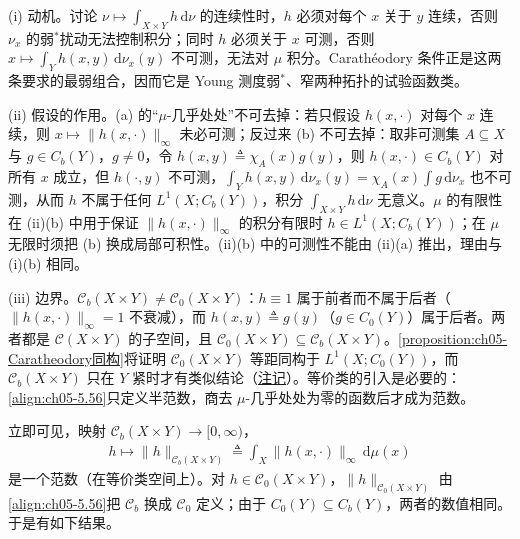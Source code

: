 \documentclass[../../main.tex]{subfiles}%
\begin{document}
\begin{remark}\label{remark:ch05-Caratheodory动机}
(i) 动机。讨论 $\nu\mapsto\int_{X\times Y}h\,\mathrm{d}\nu$ 的连续性时，$h$ 必须对每个 $x$ 关于 $y$ 连续，否则 $\nu_x$ 的弱$^*$扰动无法控制积分；同时 $h$ 必须关于 $x$ 可测，否则 $x\mapsto\int_Yh(x,y)\,\mathrm{d}\nu_x(y)$ 不可测，无法对 $\mu$ 积分。Carathéodory 条件正是这两条要求的最弱组合，因而它是 Young 测度弱$^*$、窄两种拓扑的试验函数类。

(ii) 假设的作用。(a) 的“$\mu$-几乎处处”不可去掉：若只假设 $h(x,\cdot)$ 对每个 $x$ 连续，则 $x\mapsto\|h(x,\cdot)\|_\infty$ 未必可测；反过来 (b) 不可去掉：取非可测集 $A\subseteq X$ 与 $g\in C_b(Y)$，$g\neq0$，令 $h(x,y)\triangleq\chi_A(x)g(y)$，则 $h(x,\cdot)\in C_b(Y)$ 对所有 $x$ 成立，但 $h(\cdot,y)$ 不可测，$\int_Yh(x,y)\,\mathrm{d}\nu_x(y)=\chi_A(x)\int g\,\mathrm{d}\nu_x$ 也不可测，从而 $h$ 不属于任何 $L^1(X;C_b(Y))$，积分 $\int_{X\times Y}h\,\mathrm{d}\nu$ 无意义。$\mu$ 的有限性在 (ii)(b) 中用于保证 $\|h(x,\cdot)\|_\infty$ 的积分有限时 $h\in L^1(X;C_b(Y))$；在 $\mu$ 无限时须把 (b) 换成局部可积性。(ii)(b) 中的可测性不能由 (ii)(a) 推出，理由与 (i)(b) 相同。

(iii) 边界。$\mathcal{C}_b(X\times Y)\neq\mathcal{C}_0(X\times Y)$：$h\equiv1$ 属于前者而不属于后者（$\|h(x,\cdot)\|_\infty=1$ 不衰减），而 $h(x,y)\triangleq g(y)$（$g\in C_0(Y)$）属于后者。两者都是 $\mathcal{C}(X\times Y)$ 的子空间，且 $\mathcal{C}_0(X\times Y)\subseteq\mathcal{C}_b(X\times Y)$。\cref{proposition:ch05-Caratheodory同构}将证明 $\mathcal{C}_0(X\times Y)$ 等距同构于 $L^1(X;C_0(Y))$，而 $\mathcal{C}_b(X\times Y)$ 只在 $Y$ 紧时才有类似结论（\hyperref[remark:ch05-紧空间同构]{注记}）。等价类的引入是必要的：\eqref{align:ch05-5.56}只定义半范数，商去 $\mu$-几乎处处为零的函数后才成为范数。
\end{remark}

立即可见，映射 $\mathcal{C}_b(X\times Y)\to[0,\infty)$，
\begin{align}
h\mapsto\|h\|_{\mathcal{C}_b(X\times Y)}
\triangleq \int_X\|h(x,\cdot)\|_\infty\,\mathrm{d}\mu(x)\label{align:ch05-5.56}
\end{align}
是一个范数（在等价类空间上）。对 $h\in\mathcal{C}_0(X\times Y)$，$\|h\|_{\mathcal{C}_0(X\times Y)}$ 由\eqref{align:ch05-5.56}把 $\mathcal{C}_b$ 换成 $\mathcal{C}_0$ 定义；由于 $C_0(Y)\subseteq C_b(Y)$，两者的数值相同。于是有如下结果。
\end{document}
